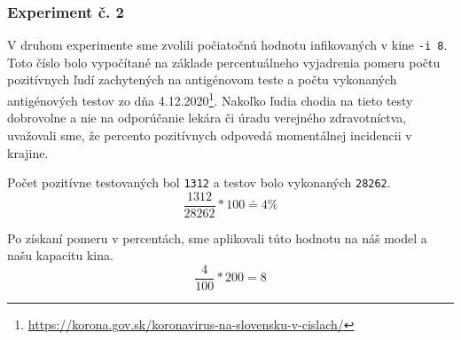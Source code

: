 \documentclass[a4paper, 11pt]{article}
\begin{document}
        \par
        
        \subsubsection{Experiment č. 2}
        \label{sec:ex.2}
            V druhom experimente sme zvolili počiatočnú hodnotu infikovaných v kine \texttt{-i 8}. Toto číslo bolo vypočítané na základe percentuálneho vyjadrenia pomeru počtu pozitívnych ľudí zachytených na antigénovom teste a počtu vykonaných antigénových testov zo dňa 4.12.2020\footnote{\href{https://korona.gov.sk/koronavirus-na-slovensku-v-cislach/}{https://korona.gov.sk/koronavirus-na-slovensku-v-cislach/}}. Nakoľko ľudia chodia na tieto testy dobrovolne a nie na odporúčanie lekára či úradu verejného zdravotníctva, uvažovali sme, že percento pozitívnych odpovedá momentálnej incidencii v krajine.
            
            \par Počet pozitívne testovaných bol \texttt{1312} a testov bolo vykonaných \texttt{28262}.
            $$ \frac{1312}{28262} * 100 \doteq 4\% $$
            
            \par Po získaní pomeru v percentách, sme aplikovali túto hodnotu na náš model a našu kapacitu kina.
            $$ \frac{4}{100} * 200 = 8 $$
            
\end{document}
